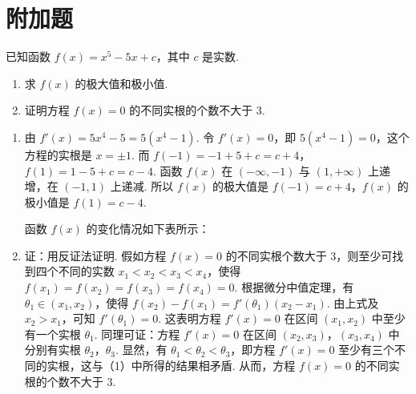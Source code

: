 \documentclass[UTF8,a4paper,oneside,11pt]{ctexbook}
\begin{document}
\section{附加题}

\begin{problem}

已知函数 \(f(x)=x^{5}-5x+c \)，其中 \(c\) 是实数.

\begin{enumerate}
\item 求 \(f(x)\) 的极大值和极小值.
\item 证明方程 \(f(x)=0\) 的不同实根的个数不大于 \(3\).
\end{enumerate}
\end{problem}

\begin{solution}
\begin{enumerate}
\item 由 \(f'(x)=5x^{4}-5=5(x^{4}-1)\). 令 \(f'(x)=0\)，即 \(5(x^{4}-1)=0\)，这个方程的实根是 \(x=\pm1\). 而
\(f(-1) = -1 + 5 + c = c + 4\)，\(f(1) = 1 - 5 + c = c - 4\).
函数 \(f(x)\) 在 \((-\infty,-1)\) 与 \((1,+\infty)\) 上递增，在 \((-1,1)\) 上递减. 所以 \(f(x)\) 的极大值是 \(f(-1)=c+4\)，\(f(x)\) 的极小值是 \(f(1)=c-4\).

函数 \(f(x)\) 的变化情况如下表所示：


\item 证：用反证法证明. 假如方程 \(f(x) = 0\) 的不同实根个数大于 \(3\)，则至少可找到四个不同的实数 \(x_{1} < x_{2} < x_{3} < x_{4}\)，使得
\(f(x_{1}) = f(x_{2}) = f(x_{3}) = f(x_{4}) = 0\).
根据微分中值定理，有 \(\theta_{1}\in(x_{1},x_{2})\)，使得
\(f(x_{2}) - f(x_{1}) = f'(\theta_{1})(x_{2} - x_{1})\).
由上式及 \(x_{2} > x_{1}\)，可知 \(f'(\theta_1) = 0\). 这表明方程 \(f'(x) = 0\) 在区间 \((x_{1},x_{2})\) 中至少有一个实根 \(\theta_{1}\). 同理可证：方程 \(f'(x)=0\) 在区间 \((x_{2}, x_{3})\)，\((x_{3}, x_{4})\) 中分别有实根 \(\theta_{2}\)，\(\theta_{3}\). 显然，有 \(\theta_{1}<\theta_{2}<\theta_{3}\)，即方程 \(f'(x)=0\) 至少有三个不同的实根，这与（1）中所得的结果相矛盾. 从而，方程 \(f(x)=0\) 的不同实根的个数不大于 \(3\).
\end{enumerate}
\end{solution}

\end{document}

